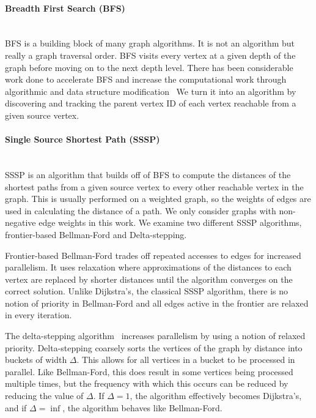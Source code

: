 \paragraph{Breadth First Search (BFS)}\mbox{}\\
BFS is a building block of many graph algorithms. 
It is not an algorithm but really a graph traversal order. 
BFS visits every vertex at a given depth of the graph before moving on to the next depth level.
There has been considerable work done to accelerate BFS and increase the computational work through algorithmic and data structure modification~\cite{agarwal2010scalable,beamer-bfs-direction,bulucc2011parallel,hong2011efficient,yoo2005scalable}
We turn it into an algorithm by discovering and tracking the parent vertex ID of each vertex reachable from a given source vertex.

\paragraph{Single Source Shortest Path (SSSP)}\mbox{}\\
SSSP is an algorithm that builds off of BFS to compute the distances of the shortest paths from a given source vertex to every other reachable vertex in the graph.
This is usually performed on a weighted graph, so the weights of edges are used in calculating the distance of a path.
We only consider graphs with non-negative edge weights in this work.
We examine two different SSSP algorithms, frontier-based Bellman-Ford and Delta-stepping.

Frontier-based Bellman-Ford trades off repeated accesses to edges for increased parallelism. 
It uses relaxation where approximations of the distances to each vertex are replaced by shorter distances until the algorithm converges on the correct solution.
Unlike Dijkstra's, the classical SSSP algorithm, there is no notion of priority in Bellman-Ford and all edges active in the frontier are relaxed in every iteration.

The delta-stepping algorithm~\cite{meyer2003delta} increases parallelism by using a notion of relaxed priority. 
Delta-stepping coarsely sorts the vertices of the graph by distance into buckets of width $\Delta$.
This allows for all vertices in a bucket to be processed in parallel. 
Like Bellman-Ford, this does result in some vertices being processed multiple times, but the frequency with which this occurs can be reduced by reducing the value of $\Delta$.
If $\Delta=1$, the algorithm effectively becomes Dijkstra's, and if $\Delta=\inf$, the algorithm behaves like Bellman-Ford. 

